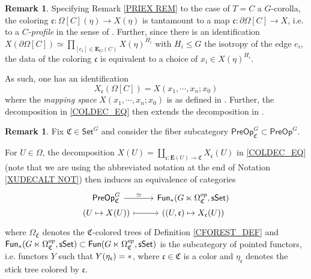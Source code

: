 \documentclass[a4paper,10pt]{article}%
\numberwithin{equation}{section}
\numberwithin{figure}{section}
\theoremstyle{definition} %
\newtheorem{remark}[equation]{Remark}%
\newcommand{\1}{\ensuremath{\mathbbm 1}}%
\begin{document}
\begin{remark}\label{MAPSPTRANS REM}
	Specifying Remark \ref{PRIEX REM} to the case 
	of $T=C$ a $G$-corolla, the coloring
	$\mathfrak{c} \colon 
	\Omega[C](\eta) \to X(\eta)$
	is tantamount to a map
	$\mathfrak{c} \colon \partial \Omega[C] \to X$,
	i.e. to a \emph{$C$-profile} in the sense of 
	\cite[Def. 5.6]{BP_edss}.
	Further, since there is an identification
	$X(\partial \Omega[C])
	\simeq
	\prod_{[e_i] \in \boldsymbol{E}_G(C)} X(\eta)^{H_i}$
	with $H_i \leq G$ the isotropy of the edge $e_i$,
	the data of the coloring $\mathfrak{c}$
	is equivalent to a choice of $x_i \in X(\eta)^{H_i}$.
	
	As such, one has an identification
\begin{equation}\label{MAPSPTRANS EQ}
	X_{\mathfrak{c}}(\Omega[C]) = X(x_1,\cdots,x_n;x_0)
\end{equation}
	where the \emph{mapping space}
	$X(x_1,\cdots,x_n;x_0)$
	is as defined in \cite[Defn. 5.7]{BP_edss}.
	Further, 
	the decomposition in \eqref{COLDEC_EQ} %
	then extends the decomposition in 
	\cite[Rem. 5.14]{BP_edss}.
\end{remark}



\begin{remark}
	Fix $\mathfrak{C} \in \mathsf{Set}^G$
	and consider the fiber subcategory 
	$\mathsf{PreOp}^G_{\mathfrak{C}} \subset \mathsf{PreOp}^G$.
	
	For $U \in \Omega$, the decomposition
	$X(U) = \coprod_{\mathfrak{c} \colon \boldsymbol{E}(U) \to \mathfrak{C}} X_{\mathfrak{c}}(U)$
	in \eqref{COLDEC_EQ} %
	(note that we are using the abbreviated notation at the end of
	Notation \ref{XUDECALT NOT})
	then induces an equivalence of categories
\begin{equation}\label{PREOPCOLFIXEQ EQ}
\begin{tikzcd}[row sep = 0]
	\mathsf{PreOp}^G_{\mathfrak{C}}
	\ar{r}{\simeq}
&
	\mathsf{Fun}_{\**}(G \ltimes \Omega^{op}_{\mathfrak{C}},\mathsf{sSet})
\\
	(U \mapsto X(U))
	\ar[mapsto]{r}
&
	((U,\mathfrak{c}) \mapsto X_{\mathfrak{c}}(U))
\end{tikzcd}
\end{equation}
	where $\Omega_{\mathfrak{C}}$
	denotes the $\mathfrak{C}$-colored trees of 
	Definition \ref{CFOREST_DEF} and 
	$\mathsf{Fun}_{\**}(G \ltimes \Omega^{op}_{\mathfrak{C}},\mathsf{sSet})
	\subset
	\mathsf{Fun}(G \ltimes \Omega^{op}_{\mathfrak{C}},\mathsf{sSet})$
	is the subcategory of pointed functors,
	i.e. functors $Y$ such that
	$Y(\eta_{\mathfrak{c}}) = \**$,
	where $\mathfrak{c} \in \mathfrak{C}$ is a color
	and $\eta_{\mathfrak{c}}$ denotes the stick tree colored by $\mathfrak{c}$.
\end{remark}
\end{document}
